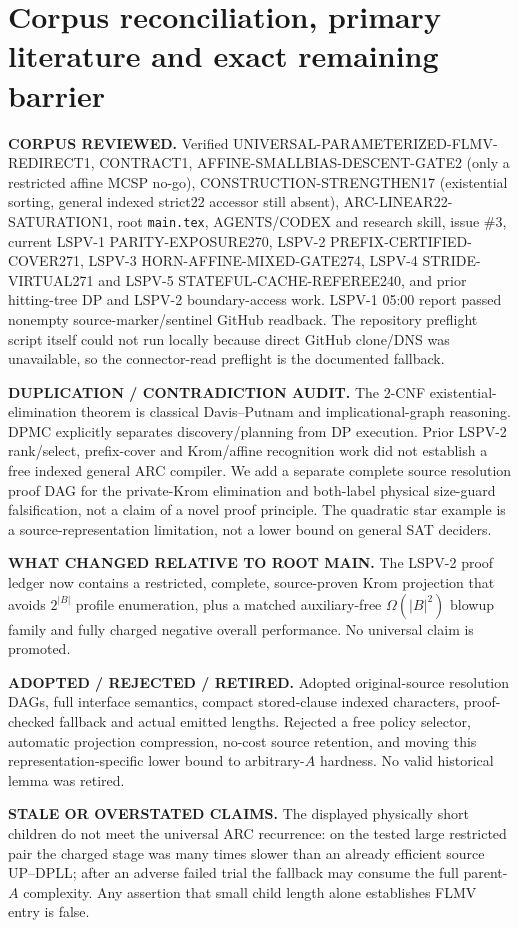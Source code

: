 \documentclass[11pt]{article}
\begin{document}
\section{Corpus reconciliation, primary literature and exact remaining barrier}
\textbf{CORPUS REVIEWED.} Verified UNIVERSAL-PARAMETERIZED-FLMV-REDIRECT1, CONTRACT1, AFFINE-SMALLBIAS-DESCENT-GATE2 (only a restricted affine MCSP no-go), CONSTRUCTION-STRENGTHEN17 (existential sorting, general indexed strict22 accessor still absent), ARC-LINEAR22-SATURATION1, root \texttt{main.tex}, AGENTS/CODEX and research skill, issue \#3, current LSPV-1 PARITY-EXPOSURE270, LSPV-2 PREFIX-CERTIFIED-COVER271, LSPV-3 HORN-AFFINE-MIXED-GATE274, LSPV-4 STRIDE-VIRTUAL271 and LSPV-5 STATEFUL-CACHE-REFEREE240, and prior hitting-tree DP and LSPV-2 boundary-access work. LSPV-1 05:00 report passed nonempty source-marker/sentinel GitHub readback. The repository preflight script itself could not run locally because direct GitHub clone/DNS was unavailable, so the connector-read preflight is the documented fallback.

\textbf{DUPLICATION / CONTRADICTION AUDIT.} The 2-CNF existential-elimination theorem is classical Davis--Putnam and implicational-graph reasoning. DPMC explicitly separates discovery/planning from DP execution. Prior LSPV-2 rank/select, prefix-cover and Krom/affine recognition work did not establish a free indexed general ARC compiler. We add a separate complete source resolution proof DAG for the private-Krom elimination and both-label physical size-guard falsification, not a claim of a novel proof principle. The quadratic star example is a source-representation limitation, not a lower bound on general SAT deciders.

\textbf{WHAT CHANGED RELATIVE TO ROOT MAIN.} The LSPV-2 proof ledger now contains a restricted, complete, source-proven Krom projection that avoids $2^{|B|}$ profile enumeration, plus a matched auxiliary-free $\Omega(|B|^2)$ blowup family and fully charged negative overall performance. No universal claim is promoted.

\textbf{ADOPTED / REJECTED / RETIRED.} Adopted original-source resolution DAGs, full interface semantics, compact stored-clause indexed characters, proof-checked fallback and actual emitted lengths. Rejected a free policy selector, automatic projection compression, no-cost source retention, and moving this representation-specific lower bound to arbitrary-$A$ hardness. No valid historical lemma was retired.

\textbf{STALE OR OVERSTATED CLAIMS.} The displayed physically short children do not meet the universal ARC recurrence: on the tested large restricted pair the charged stage was many times slower than an already efficient source UP--DPLL; after an adverse failed trial the fallback may consume the full parent-$A$ complexity. Any assertion that small child length alone establishes FLMV entry is false.
\end{document}
